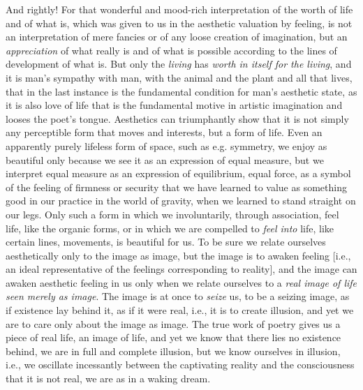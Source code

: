 \documentclass[12pt,a4paper,openany]{book}
\newcommand{\opage}[1]{\marginnote{\footnotesize\textit{[#1]}}}
\begin{document}
And rightly! For that wonderful and mood-rich interpretation of the worth of life and of
what is, which was given to us in the aesthetic valuation by feeling, is not an
interpretation of mere fancies or of any loose creation of imagination, but an
\emph{appreciation} of what really is and of what is possible according to the lines of
development of what is. But only the \emph{living} has \emph{worth in itself for the
living}, and it is man's sympathy with man, with the animal and the plant and all that
lives, that in the last instance is the fundamental condition for man's aesthetic state,
as it is also love of life that is the fundamental motive in artistic imagination and
looses the poet's tongue. Aesthetics can triumphantly show that it is not simply any
perceptible form that moves and interests, but a form of life. Even an apparently purely
lifeless form of space, such as e.g. symmetry, we enjoy as beautiful only because we see
it as an expression of equal measure, but we interpret equal measure as an expression of
equilibrium, equal force, as a symbol of the feeling of firmness or security that we have
learned to value as something good in our practice in the world of gravity, when we
learned to stand straight on our legs. Only such a form in which we involuntarily,
through association, feel life, like the organic forms, or in which we are compelled to
\emph{feel into} life, like certain lines, movements, is beautiful for us. To be sure we
relate ourselves aesthetically only to the image as
\setcounter{footnote}{0}%
\opage{263}image, but the image is to awaken feeling [i.e., an ideal representative of the
feelings corresponding to reality], and the image can awaken aesthetic feeling in us only
when we relate ourselves to a \emph{real image of life seen merely as image}. The image is
at once to \emph{seize} us, to be a seizing image, as if existence lay behind it, as if it
were real, i.e., it is to create illusion, and yet we are to care only about the image as
image. The true work of poetry gives us a piece of real life, an image of life, and yet we
know that there lies no existence behind, we are in full and complete illusion, but we
know ourselves in illusion, i.e., we oscillate incessantly between the captivating
reality and the consciousness that it is not real, we are as in a waking dream.
\end{document}
